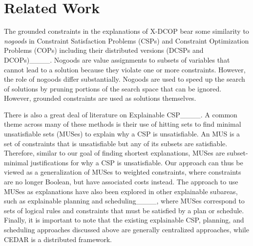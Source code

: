 \section{Related Work}
The grounded constraints in the explanations of X-DCOP bear some similarity to \emph{nogoods} in Constraint Satisfaction Problems (CSPs) and Constraint Optimization Problems (COPs) including their distributed versions (DCSPs and DCOPs)____. Nogoods are value assignments to subsets of variables that cannot lead to a solution because they violate one or more constraints. However, the role of nogoods differ substantially. Nogoods are used to speed up the search of solutions by pruning portions of the search space that can be ignored. However, grounded constraints are used as solutions themselves.

There is also a great deal of literature on Explainable CSP____. A common theme across many of these methods is their use of hitting sets to find minimal unsatisfiable sets (MUSes) to explain why a CSP is unsatisfiable. An MUS is a set of constraints that is unsatisfiable but any of its subsets are satisfiable. Therefore, similar to our goal of finding shortest explanations, MUSes are subset-minimal justifications for why a CSP is unsatisfiable. Our approach can thus be viewed as a generalization of MUSes to weighted constraints, where constraints are no longer Boolean, but have associated costs instead. The approach to use MUSes as explanations have also been explored in other explainable subareas, such as explainable planning and scheduling____, where MUSes correspond to sets of logical rules and constraints that must be satisfied by a plan or schedule. Finally, it is important to note that the existing explainable CSP, planning, and scheduling approaches discussed above are generally centralized approaches, while CEDAR is a distributed framework.

